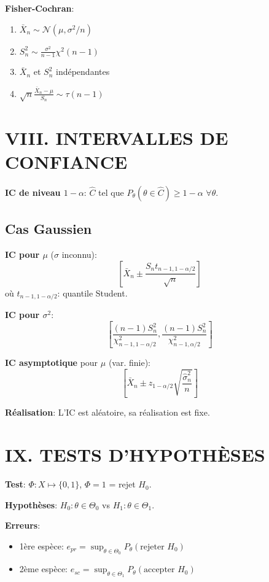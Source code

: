 \documentclass[8pt,twocolumn]{article}
\newcommand{\mydef}[1]{\textcolor{defcolor}{\textbf{#1}}}
\newcommand{\mythm}[1]{\textcolor{thmcolor}{\textbf{#1}}}
\newcommand{\myprop}[1]{\textcolor{propcolor}{\textbf{#1}}}
\newcommand{\myrem}[1]{\textcolor{remcolor}{\textbf{#1}}}
\begin{document}
\mythm{Fisher-Cochran}:
\begin{enumerate}[nosep]
\item $\bar{X}_n \sim \mathcal{N}(\mu, \sigma^2/n)$
\item $S_n^2 \sim \frac{\sigma^2}{n-1}\chi^2(n-1)$
\item $\bar{X}_n$ et $S_n^2$ indépendantes
\item $\sqrt{n}\frac{\bar{X}_n-\mu}{S_n} \sim \tau(n-1)$
\end{enumerate}

\section*{\mydef{VIII. INTERVALLES DE CONFIANCE}}

\mydef{IC de niveau $1-\alpha$}: $\hat{C}$ tel que $P_\theta(\theta\in\hat{C}) \geq 1-\alpha$ $\forall\theta$.

\subsection{Cas Gaussien}
\myprop{IC pour $\mu$} ($\sigma$ inconnu):
$$\left[\bar{X}_n \pm \frac{S_n t_{n-1,1-\alpha/2}}{\sqrt{n}}\right]$$
où $t_{n-1,1-\alpha/2}$: quantile Student.

\myprop{IC pour $\sigma^2$}:
$$\left[\frac{(n-1)S_n^2}{\chi^2_{n-1,1-\alpha/2}}, \frac{(n-1)S_n^2}{\chi^2_{n-1,\alpha/2}}\right]$$

\myprop{IC asymptotique} pour $\mu$ (var. finie):
$$\left[\bar{X}_n \pm z_{1-\alpha/2}\sqrt{\frac{\hat{\sigma}^2_n}{n}}\right]$$

\myrem{Réalisation}: L'IC est aléatoire, sa réalisation est fixe.

\section*{\mydef{IX. TESTS D'HYPOTHÈSES}}

\mydef{Test}: $\Phi:X \mapsto \{0,1\}$, $\Phi=1$ = rejet $H_0$.

\mydef{Hypothèses}: $H_0:\theta\in\Theta_0$ vs $H_1:\theta\in\Theta_1$.

\mydef{Erreurs}:
\begin{itemize}[nosep]
\item 1ère espèce: $e_{pr}=\sup_{\theta\in\Theta_0} P_\theta(\text{rejeter }H_0)$
\item 2ème espèce: $e_{sc}=\sup_{\theta\in\Theta_1} P_\theta(\text{accepter }H_0)$
\end{itemize}
\end{document}
